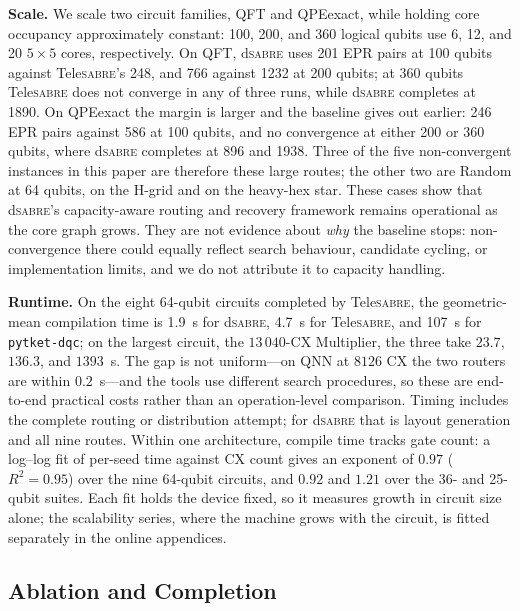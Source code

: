 \documentclass[journal]{IEEEtran}
\newcommand{\dSABRE}{d\textsc{sabre}}
\newcommand{\TeleSABRE}{Tele\textsc{sabre}}
\begin{document}
\textbf{Scale.}\label{sec:largecircuits} We scale two circuit families, QFT and QPEexact, while holding core occupancy approximately constant: 100, 200, and 360 logical qubits use 6, 12, and 20 $5\times5$ cores, respectively.  On QFT, \dSABRE{} uses 201 EPR pairs at 100 qubits against \TeleSABRE{}'s 248, and 766 against 1232 at 200 qubits; at 360 qubits \TeleSABRE{} does not converge in any of three runs, while \dSABRE{} completes at 1890.  On QPEexact the margin is larger and the baseline gives out earlier: 246 EPR pairs against 586 at 100 qubits, and no convergence at either 200 or 360 qubits, where \dSABRE{} completes at 896 and 1938.  Three of the five non-convergent instances in this paper are therefore these large routes; the other two are Random at 64 qubits, on the H-grid and on the heavy-hex star.  These cases show that \dSABRE{}'s capacity-aware routing and recovery framework remains operational as the core graph grows.  They are not evidence about \emph{why} the baseline stops: non-convergence there could equally reflect search behaviour, candidate cycling, or implementation limits, and we do not attribute it to capacity handling.

\textbf{Runtime.} On the eight 64-qubit circuits completed by \TeleSABRE{}, the geometric-mean compilation time is 1.9~s for \dSABRE{}, 4.7~s for \TeleSABRE{}, and 107~s for \texttt{pytket-dqc}; on the largest circuit, the $13\,040$-CX Multiplier, the three take $23.7$, $136.3$, and $1393$~s.  The gap is not uniform---on QNN at $8126$ CX the two routers are within $0.2$~s---and the tools use different search procedures, so these are end-to-end practical costs rather than an operation-level comparison.  Timing includes the complete routing or distribution attempt; for \dSABRE{} that is layout generation and all nine routes.  Within one architecture, compile time tracks gate count: a log--log fit of per-seed time against CX count gives an exponent of $0.97$ ($R^2{=}0.95$) over the nine 64-qubit circuits, and $0.92$ and $1.21$ over the 36- and 25-qubit suites.  Each fit holds the device fixed, so it measures growth in circuit size alone; the scalability series, where the machine grows with the circuit, is fitted separately in the online appendices.

\subsection{Ablation and Completion}
\label{sec:ablation}
\end{document}
